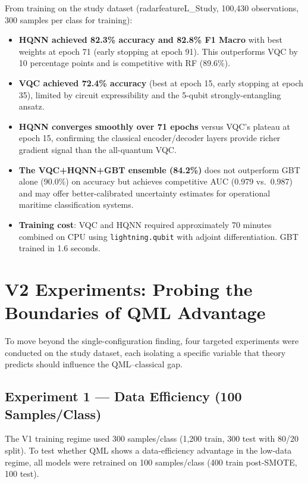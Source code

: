 \documentclass[journal]{IEEEtran}
\begin{document}
From training on the study dataset (radarfeatureL\_Study, 100,430 observations,
300 samples per class for training):
\begin{itemize}
  \item \textbf{HQNN achieved 82.3\% accuracy and 82.8\% F1 Macro} with best
        weights at epoch 71 (early stopping at epoch 91). This outperforms
        VQC by 10 percentage points and is competitive with RF (89.6\%).
  \item \textbf{VQC achieved 72.4\% accuracy} (best at epoch 15, early stopping
        at epoch 35), limited by circuit expressibility and the 5-qubit
        strongly-entangling ansatz.
  \item \textbf{HQNN converges smoothly over 71 epochs} versus VQC's plateau
        at epoch 15, confirming the classical encoder/decoder layers provide
        richer gradient signal than the all-quantum VQC.
  \item \textbf{The VQC+HQNN+GBT ensemble (84.2\%)} does not outperform GBT
        alone (90.0\%) on accuracy but achieves competitive AUC (0.979 vs.\
        0.987) and may offer better-calibrated uncertainty estimates for
        operational maritime classification systems.
  \item \textbf{Training cost}: VQC and HQNN required approximately 70 minutes
        combined on CPU using \texttt{lightning.qubit} with adjoint
        differentiation. GBT trained in 1.6 seconds.
\end{itemize}

\section{V2 Experiments: Probing the Boundaries of QML Advantage}
\label{sec:v2experiments}

To move beyond the single-configuration finding, four targeted experiments
were conducted on the study dataset, each isolating a specific variable
that theory predicts should influence the QML--classical gap.

\subsection{Experiment 1 — Data Efficiency (100 Samples/Class)}

The V1 training regime used 300 samples/class (1,200 train, 300 test with
80/20 split). To test whether QML shows a data-efficiency advantage in the
low-data regime, all models were retrained on 100 samples/class (400 train
post-SMOTE, 100 test).
\end{document}
